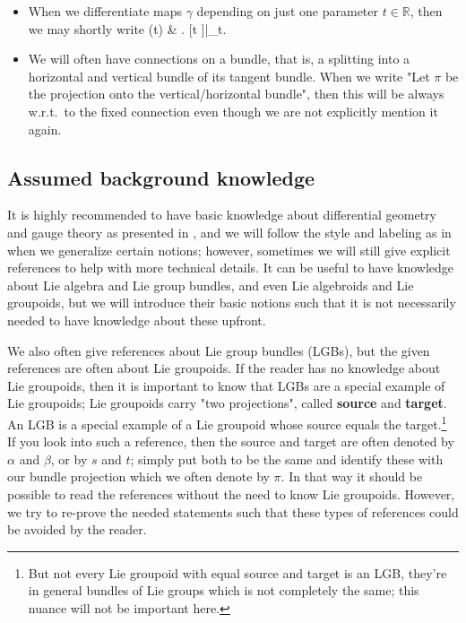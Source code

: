 \documentclass[a4paper,oneside,11pt,bibliography=totoc]{scrartcl}
\def\bas#1\eas{\begin{align*}#1\end{align*}}
\theoremstyle{plain}
\theoremstyle{remark}
\theoremstyle{definition}
\begin{document}
\begin{itemize}
\item When we differentiate maps $\gamma$ depending on just one parameter $t \in \mathbb{R}$, then we may shortly write
\bas
\frac{\mathrm{d}}{\mathrm{d}t} \gamma(t)
&\coloneqq
\mleft. [t \mapsto \gamma]\mright|_t.
\eas

\item We will often have connections on a bundle, that is, a splitting into a horizontal and vertical bundle of its tangent bundle. When we write "Let $\pi$ be the projection onto the vertical/horizontal bundle", then this will be always w.r.t.\ to the fixed connection even though we are not explicitly mention it again.
\end{itemize}

\subsection{Assumed background knowledge}

It is highly recommended to have basic knowledge about differential geometry and gauge theory as presented in \cite[especially Chapter 1 to 5]{Hamilton}, and we will follow the style and labeling as in \cite{Hamilton} when we generalize certain notions; however, sometimes we will still give explicit references to help with more technical details. It can be useful to have knowledge about Lie algebra and Lie group bundles, and even Lie algebroids and Lie groupoids, but we will introduce their basic notions such that it is not necessarily needed to have knowledge about these upfront.

We also often give references about Lie group bundles (LGBs), but the given references are often about Lie groupoids. If the reader has no knowledge about Lie groupoids, then it is important to know that LGBs are a special example of Lie groupoids; Lie groupoids carry "two projections", called \textbf{source} and \textbf{target}. An LGB is a special example of a Lie groupoid whose source equals the target.\footnote{But not every Lie groupoid with equal source and target is an LGB, they're in general bundles of Lie groups which is not completely the same; this nuance will not be important here.} If you look into such a reference, then the source and target are often denoted by $\alpha$ and $\beta$, or by $s$ and $t$; simply put both to be the same and identify these with our bundle projection which we often denote by $\pi$. In that way it should be possible to read the references without the need to know Lie groupoids. However, we try to re-prove the needed statements such that these types of references could be avoided by the reader.
\end{document}
